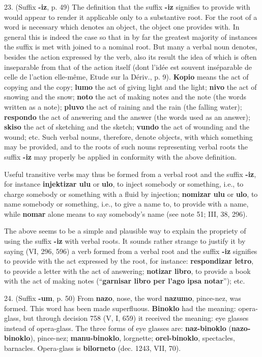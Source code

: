 23. (Suffix \textbf{-iz}, p. 49) The definition that the suffix \textbf{-iz} signifies to provide with would appear to render it applicable only to a substantive root. For the root of a word is necessary which denotes an object, the object one provides with. In general this is indeed the case so that in by far the greatest majority of instances the suffix is met with joined to a nominal root. But many a verbal noun denotes, besides the action expressed by the verb, also its result the idea of which is often inseparable from that of the action itself (dont l'idée est souvent inséparable de celle de l'action elle-même, Etude sur la Dériv., p. 9). \textbf{Kopio} means the act of copying and the copy; \textbf{lumo} the act of giving light and the light; \textbf{nivo} the act of snowing and the snow; \textbf{noto} the act of making notes and the note (the words written as a note); \textbf{pluvo} the act of raining and the rain (the falling water); \textbf{respondo} the act of answering and the answer (the words used as an answer); \textbf{skiso} the act of sketching and the sketch; \textbf{vundo} the act of wounding and the wound; etc. Such verbal nouns, therefore, denote objects, with which something may be provided, and to the roots of such nouns representing verbal roots the suffix \textbf{-iz} may properly be applied in conformity with the above definition. %

Useful transitive verbs may thus be formed from a verbal root and the suffix \textbf{-iz}, for instance \textbf{injektizar ulu} or \textbf{ulo}, to inject somebody or something, i.e., to charge somebody or something with a fluid by injection; \textbf{nomizar ulu} or \textbf{ulo}, to name somebody or something, i.e., to give a name to, to provide with a name, while \textbf{nomar} alone means to say somebody's name (see note 51; III, 38, 296).

The above seems to be a simple and plausible way to explain the propriety of using the suffix \textbf{-iz} with verbal roots. It sounds rather strange to justify it by saying (VI, 296, 596) a verb formed from a verbal root and the suffix \textbf{-iz} signifies to provide with the act expressed by the root, for instance: \textbf{respondizar letro}, to provide a letter with the act of answering; \textbf{notizar libro}, to provide a book with the act of making notes (``\textbf{garnisar libro per l'ago ipsa notar}''); etc.

24. (Suffix \textbf{-um}, p. 50) From \textbf{nazo}, nose, the word \textbf{nazumo}, pince-nez, was formed. This word has been made superfluous. \textbf{Binoklo} had the meaning: opera-glass, but through decision 758 (V, I, 659) it received the meaning: eye glasses instead of opera-glass. The three forms of eye glasses are: \textbf{naz-binoklo} (\textbf{nazo-binoklo}), pince-nez; \textbf{manu-binoklo}, lorgnette; \textbf{orel-binoklo}, spectacles, barnacles. Opera-glass is \textbf{bilorneto} (dec. 1243, VII, 70). %


